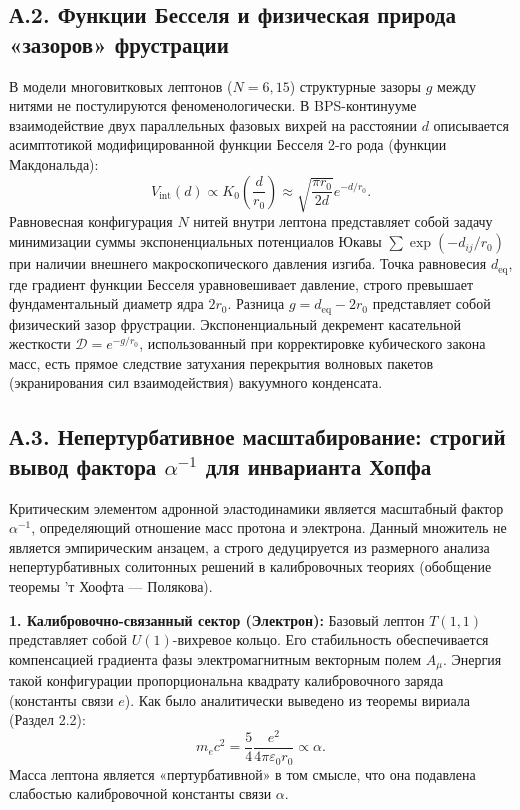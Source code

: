 \documentclass[12pt,a4paper]{article}
\begin{document}
\subsection*{А.2. Функции Бесселя и физическая природа «зазоров» фрустрации}
В модели многовитковых лептонов ($N=6, 15$) структурные зазоры $g$ между нитями не постулируются феноменологически. В BPS-континууме взаимодействие двух параллельных фазовых вихрей на расстоянии $d$ описывается асимптотикой модифицированной функции Бесселя 2-го рода (функции Макдональда):
\begin{equation}
V_{\text{int}}(d) \propto K_0\left(\frac{d}{r_0}\right) \approx \sqrt{\frac{\pi r_0}{2d}} e^{-d/r_0}.
\end{equation}
Равновесная конфигурация $N$ нитей внутри лептона представляет собой задачу минимизации суммы экспоненциальных потенциалов Юкавы $\sum \exp(-d_{ij}/r_0)$ при наличии внешнего макроскопического давления изгиба. Точка равновесия $d_{\text{eq}}$, где градиент функции Бесселя уравновешивает давление, строго превышает фундаментальный диаметр ядра $2r_0$. 
Разница $g = d_{\text{eq}} - 2r_0$ представляет собой физический зазор фрустрации. Экспоненциальный декремент касательной жесткости $\mathcal{D} = e^{-g/r_0}$, использованный при корректировке кубического закона масс, есть прямое следствие затухания перекрытия волновых пакетов (экранирования сил взаимодействия) вакуумного конденсата.

\subsection*{А.3. Непертурбативное масштабирование: строгий вывод фактора $\alpha^{-1}$ для инварианта Хопфа}

Критическим элементом адронной эластодинамики является масштабный фактор $\alpha^{-1}$, определяющий отношение масс протона и электрона. Данный множитель не является эмпирическим анзацем, а строго дедуцируется из размерного анализа непертурбативных солитонных решений в калибровочных теориях (обобщение теоремы ’т Хоофта — Полякова).

\textbf{1. Калибровочно-связанный сектор (Электрон):}
Базовый лептон $T(1,1)$ представляет собой $U(1)$-вихревое кольцо. Его стабильность обеспечивается компенсацией градиента фазы электромагнитным векторным полем $A_\mu$. Энергия такой конфигурации пропорциональна квадрату калибровочного заряда (константы связи $e$). Как было аналитически выведено из теоремы вириала (Раздел 2.2):
\begin{equation}
	m_e c^2 = \frac{5}{4} \frac{e^2}{4\pi\varepsilon_0 r_0} \propto \alpha.
	\label{eq:me_scaling}
\end{equation}
Масса лептона является «пертурбативной» в том смысле, что она подавлена слабостью калибровочной константы связи $\alpha$.
\end{document}
